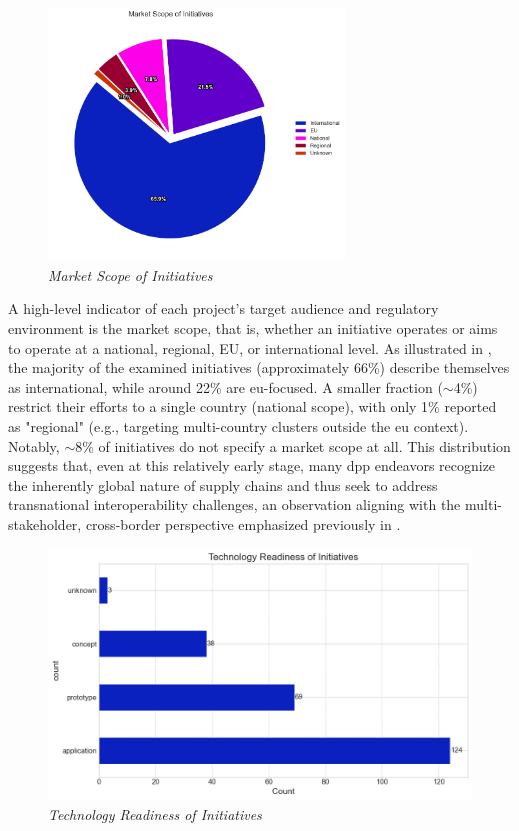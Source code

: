 \begin{figure}[htbp]
  \centering
  \includegraphics[width=0.7\textwidth]{figures/initiatives_market_scope.png}
  \caption{%
    \textit{Market Scope of Initiatives} 
  }
  \label{fig:initiatives_market_scope}
\end{figure}

A high-level indicator of each project’s target audience and regulatory environment is the market scope, that is, whether an initiative operates or aims to operate at a national, regional, EU, or international level. As illustrated in , the majority of the examined initiatives (approximately 66\%) describe themselves as international, while around 22\% are \ac{eu}-focused. A smaller fraction ($\sim$4\%) restrict their efforts to a single country (national scope), with only 1\% reported as "regional" (e.g., targeting multi-country clusters outside the \ac{eu} context). Notably, $\sim$8\% of initiatives do not specify a market scope at all. This distribution suggests that, even at this relatively early stage, many \ac{dpp} endeavors recognize the inherently global nature of supply chains and thus seek to address transnational interoperability challenges, an observation aligning with the multi-stakeholder, cross-border perspective emphasized previously in .

\begin{figure}[htbp]
  \centering
  \includegraphics[width=\textwidth]{figures/initiatives_tech_readiness.png}
  \caption{%
    \textit{Technology Readiness of Initiatives} 
  }
  \label{fig:initiatives_tech_readiness}
\end{figure}

